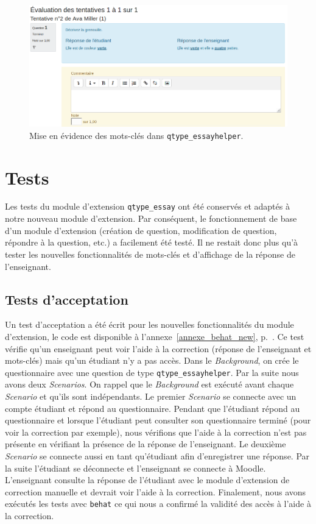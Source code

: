 \begin{figure}[htbp]
  \includegraphics[scale=0.56]{images/correction-essayhelper.png}
  \caption{Mise en \'evidence des mots-cl\'es dans \texttt{qtype\_essayhelper}.}
  \label{dev-correction-screenshot}
\end{figure}
\section{Tests} \label{dev_test}
Les tests du module d'extension \texttt{qtype\_essay} ont \'et\'e conserv\'es et adapt\'es \`a notre nouveau module d'extension.
Par cons\'equent, le fonctionnement de base d'un module d'extension (cr\'eation de question, modification de question, r\'epondre \`a la question, etc.) a facilement \'et\'e test\'e.
Il ne restait donc plus qu'\`a tester les nouvelles fonctionnalit\'es de mots-cl\'es et d'affichage de la r\'eponse de l'enseignant.
\subsection{Tests d'acceptation} \label{dev_test_acceptation}
Un test d'acceptation a \'et\'e \'ecrit pour les nouvelles fonctionnalit\'es du module d'extension, le code est disponible \`a l'annexe~\ref{annexe_behat_new}, p.~\pageref{annexe_behat_new}.
Ce test v\'erifie qu'un enseignant peut voir l'aide \`a la correction (r\'eponse de l'enseignant et mots-cl\'es) mais qu'un \'etudiant n'y a pas acc\`es.
Dans le \textit{Background}, on crée le questionnaire avec une question de type \texttt{qtype\_essayhelper}.
Par la suite nous avons deux \textit{Scenarios}.
On rappel que le \textit{Background} est ex\'ecut\'e avant chaque \textit{Scenario} et qu'ils sont ind\'ependants.
Le premier \textit{Scenario} se connecte avec un compte \'etudiant et r\'epond au questionnaire.
Pendant que l'\'etudiant r\'epond au questionnaire et lorsque l'\'etudiant peut consulter son questionnaire termin\'e (pour voir la correction par exemple), nous v\'erifions que l'aide \`a la correction n'est pas pr\'esente en v\'erifiant la pr\'esence de la r\'eponse de l'enseignant.
Le deuxi\`eme \textit{Scenario} se connecte aussi en tant qu'\'etudiant afin d'enregistrer une r\'eponse.
Par la suite l'\'etudiant se d\'econnecte et l'enseignant se connecte à Moodle.
L'enseignant consulte la r\'eponse de l'\'etudiant avec le module d'extension de correction manuelle et devrait voir l'aide \`a la correction.
Finalement, nous avons ex\'ecut\'es les tests avec \texttt{behat} ce qui nous a confirm\'e la validit\'e des acc\`es \`a l'aide \`a la correction.

